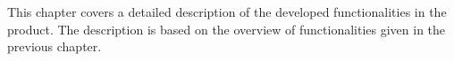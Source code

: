 This chapter covers a detailed description of the developed functionalities in the product. The description is based  on the overview of functionalities given in the previous chapter.

